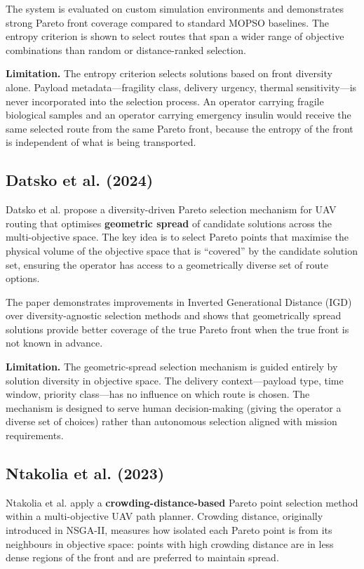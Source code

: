 The system is evaluated on custom simulation environments and demonstrates strong Pareto
front coverage compared to standard MOPSO baselines. The entropy criterion is shown to
select routes that span a wider range of objective combinations than random or
distance-ranked selection.

\textbf{Limitation.} The entropy criterion selects solutions based on front diversity
alone. Payload metadata---fragility class, delivery urgency, thermal sensitivity---is
never incorporated into the selection process. An operator carrying fragile biological
samples and an operator carrying emergency insulin would receive the same selected route
from the same Pareto front, because the entropy of the front is independent of what is
being transported.

\subsection{Datsko et al. (2024)}

Datsko et al. \cite{datsko2024} propose a diversity-driven Pareto selection mechanism for
UAV routing that optimises \textbf{geometric spread} of candidate solutions across the
multi-objective space. The key idea is to select Pareto points that maximise the physical
volume of the objective space that is ``covered'' by the candidate solution set, ensuring
the operator has access to a geometrically diverse set of route options.

The paper demonstrates improvements in Inverted Generational Distance (IGD) over
diversity-agnostic selection methods and shows that geometrically spread solutions
provide better coverage of the true Pareto front when the true front is not known in
advance.

\textbf{Limitation.} The geometric-spread selection mechanism is guided entirely by
solution diversity in objective space. The delivery context---payload type, time window,
priority class---has no influence on which route is chosen. The mechanism is designed to
serve human decision-making (giving the operator a diverse set of choices) rather than
autonomous selection aligned with mission requirements.

\subsection{Ntakolia et al. (2023)}

Ntakolia et al. \cite{ntakolia2023} apply a \textbf{crowding-distance-based} Pareto
point selection method within a multi-objective UAV path planner. Crowding distance,
originally introduced in NSGA-II, measures how isolated each Pareto point is from its
neighbours in objective space: points with high crowding distance are in less dense
regions of the front and are preferred to maintain spread.

